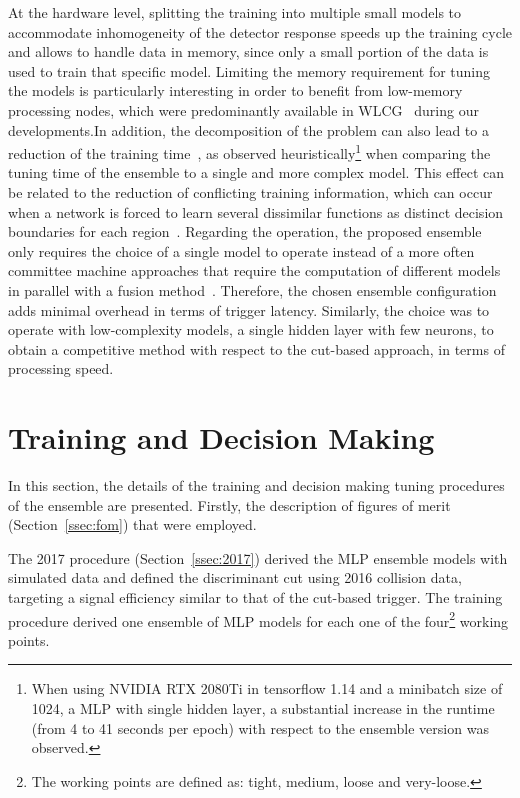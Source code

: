 At the hardware level, splitting the training into multiple small models to accommodate inhomogeneity of the detector response speeds up the training cycle and allows to handle data in memory, since only a small portion of the data is used to train that specific model. Limiting the memory requirement for tuning
the models is particularly interesting in order to benefit from low-memory 
 processing nodes, which were predominantly available in 
WLCG~\cite{2015_lcg_tdr} during our
developments.\@ In addition, the decomposition of the problem can also lead to a
reduction of the training time~\cite{Polikar2006}, as observed heuristically\footnote{
  When using NVIDIA RTX 2080Ti in tensorflow 1.14 and a minibatch size of 1024, a 
  MLP with single hidden layer, a substantial increase in the runtime (from 4 
  to 41 seconds per epoch) with respect to the ensemble version was observed.} when
comparing the tuning time of the ensemble to a single and more complex model. This effect can be related to the reduction of conflicting training information, which can occur when a network is forced to learn several dissimilar functions
as distinct decision boundaries for each region~\cite{Auda1999,haykin_2008}.
Regarding the operation, the proposed ensemble only requires the choice of a
single model to operate instead of a more often committee machine approaches
that require the computation of different models in parallel with a fusion
method~\cite{zhou_ensemble}.  Therefore, the chosen ensemble configuration adds
minimal overhead in terms of trigger latency. Similarly, the choice was to
operate with low-complexity models, a single hidden layer with few neurons, to obtain a competitive method with respect to the cut-based
approach, in terms of processing speed.



\section{Training and Decision Making}%
\label{sec:tuning}

In this section, the details of the training and decision making tuning procedures
of the \rnn ensemble are presented. Firstly, the description of figures of merit (Section~\ref{ssec:fom}) that were employed.

The 2017 procedure (Section~\ref{ssec:2017}) derived the MLP ensemble
models with simulated data and defined the discriminant cut using
2016 collision data, targeting a signal efficiency similar to that of the cut-based trigger.
The training procedure derived one ensemble of MLP models for each one of the four\footnote{The working points are defined as: tight, medium, loose and very-loose.} working points. 

